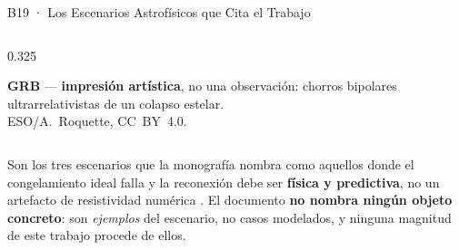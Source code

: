 \documentclass[aspectratio=169,9pt]{beamer}
\begin{document}
\begin{frame}{B19 · Los Escenarios Astrof\'isicos que Cita el Trabajo}
\begin{columns}[T]
\begin{column}{0.325\textwidth}
\begin{center}
    {\tiny\color{INF3}\textbf{GRB} --- \textcolor{brick}{\textbf{impresi\'on
     art\'istica}}, no una observaci\'on: chorros bipolares ultrarrelativistas
     de un colapso estelar.\\
     {\color{INF2}ESO/A.\ Roquette, CC~BY~4.0.}}
  \end{center}
\end{column}
\end{columns}
\vspace{0.10cm}
\begin{tcolorbox}[WRN={Por qu\'e est\'an aqu\'i --- y qu\'e no afirman}]
  \scriptsize
  Son los tres escenarios que la monograf\'ia nombra como aquellos donde el
  congelamiento ideal falla y la reconexi\'on debe ser \textbf{f\'isica y
  predictiva}, no un artefacto de resistividad num\'erica
  \citep{miranda-aranguren-2018,palenzuela-2009}. El documento \textbf{no
  nombra ning\'un objeto concreto}: son \emph{ejemplos} del escenario, no
  casos modelados, y ninguna magnitud de este trabajo procede de ellos.
\end{tcolorbox}
\end{frame}
\end{document}
